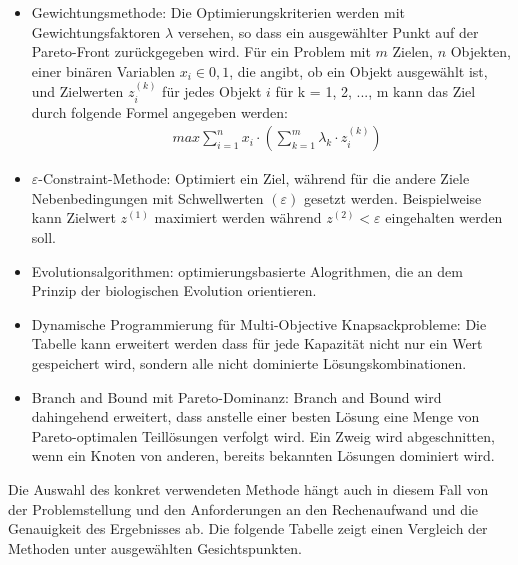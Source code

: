 \begin{itemize}
    \item Gewichtungsmethode: Die Optimierungskriterien werden mit Gewichtungsfaktoren $ \lambda $ versehen, so dass ein ausgewählter Punkt auf der Pareto-Front zurückgegeben wird. Für ein Problem mit $ m $ Zielen, $ n $ Objekten, einer binären Variablen $ x_i \in {0, 1} $, die angibt, ob ein Objekt ausgewählt ist, und Zielwerten $ z_i^{(k)} $ für jedes Objekt $ i $ für k = 1, 2, ..., m kann das Ziel durch folgende Formel angegeben werden:
        \begin{align}
            & max \sum_{i=1}^{n} x_i \cdot (\sum_{k=1}^{m} \lambda_k \cdot z_i^{(k)})
        \end{align}
    \item $ \varepsilon $-Constraint-Methode: Optimiert ein Ziel, während für die andere Ziele Nebenbedingungen mit Schwellwerten $(\varepsilon)$ gesetzt werden. Beispielweise kann Zielwert $ z^{(1)} $ maximiert werden während $ z^{(2)} < \varepsilon $ eingehalten werden soll.
    \item Evolutionsalgorithmen: optimierungsbasierte Alogrithmen, die an dem Prinzip der biologischen Evolution orientieren. 
    \item Dynamische Programmierung für Multi-Objective Knapsackprobleme: Die Tabelle kann erweitert werden dass für jede Kapazität nicht nur ein Wert gespeichert wird, sondern alle nicht dominierte Lösungskombinationen.
    \item Branch and Bound mit Pareto-Dominanz: Branch and Bound wird dahingehend erweitert, dass anstelle einer besten Lösung eine Menge von Pareto-optimalen Teillösungen verfolgt wird. Ein Zweig wird abgeschnitten, wenn ein Knoten von anderen, bereits bekannten Lösungen dominiert wird.
\end{itemize}

Die Auswahl des konkret verwendeten Methode hängt auch in diesem Fall von der Problemstellung und den Anforderungen an den Rechenaufwand und die Genauigkeit des Ergebnisses ab. Die folgende Tabelle zeigt einen Vergleich der Methoden unter ausgewählten Gesichtspunkten.

